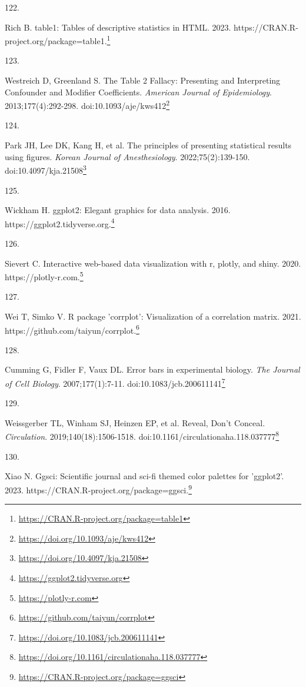 \documentclass[
]{book}
\newlength{\cslhangindent}
\newlength{\csllabelwidth}
\newlength{\cslentryspacingunit} %
\newenvironment{CSLReferences}[2] %
 {%
  \setlength{\parindent}{0pt}
  \ifodd #1
  \let\oldpar\par
  \def\par{\hangindent=\cslhangindent\oldpar}
  \fi
  \setlength{\parskip}{#2\cslentryspacingunit}
 }%
 {}
\newcommand{\CSLLeftMargin}[1]{\parbox[t]{\csllabelwidth}{#1}}
\newcommand{\CSLRightInline}[1]{\parbox[t]{\linewidth - \csllabelwidth}{#1}\break}
\renewcommand{\href}[2]{#2\footnote{\url{#1}}}
\begin{document}
\begin{CSLReferences}{0}{0}
\leavevmode{}%
\CSLLeftMargin{122. }%
\CSLRightInline{Rich B. table1: Tables of descriptive statistics in HTML. 2023. \href{https://CRAN.R-project.org/package=table1}{https://CRAN.R-project.org/package=table1.}}

\leavevmode{}%
\CSLLeftMargin{123. }%
\CSLRightInline{Westreich D, Greenland S. The Table 2 Fallacy: Presenting and Interpreting Confounder and Modifier Coefficients. \emph{American Journal of Epidemiology}. 2013;177(4):292-298. doi:\href{https://doi.org/10.1093/aje/kws412}{10.1093/aje/kws412}}

\leavevmode{}%
\CSLLeftMargin{124. }%
\CSLRightInline{Park JH, Lee DK, Kang H, et al. The principles of presenting statistical results using figures. \emph{Korean Journal of Anesthesiology}. 2022;75(2):139-150. doi:\href{https://doi.org/10.4097/kja.21508}{10.4097/kja.21508}}

\leavevmode{}%
\CSLLeftMargin{125. }%
\CSLRightInline{Wickham H. ggplot2: Elegant graphics for data analysis. 2016. \href{https://ggplot2.tidyverse.org}{https://ggplot2.tidyverse.org.}}

\leavevmode{}%
\CSLLeftMargin{126. }%
\CSLRightInline{Sievert C. Interactive web-based data visualization with r, plotly, and shiny. 2020. \href{https://plotly-r.com}{https://plotly-r.com.}}

\leavevmode{}%
\CSLLeftMargin{127. }%
\CSLRightInline{Wei T, Simko V. R package 'corrplot': Visualization of a correlation matrix. 2021. \href{https://github.com/taiyun/corrplot}{https://github.com/taiyun/corrplot.}}

\leavevmode{}%
\CSLLeftMargin{128. }%
\CSLRightInline{Cumming G, Fidler F, Vaux DL. Error bars in experimental biology. \emph{The Journal of Cell Biology}. 2007;177(1):7-11. doi:\href{https://doi.org/10.1083/jcb.200611141}{10.1083/jcb.200611141}}

\leavevmode{}%
\CSLLeftMargin{129. }%
\CSLRightInline{Weissgerber TL, Winham SJ, Heinzen EP, et al. Reveal, Don{'}t Conceal. \emph{Circulation}. 2019;140(18):1506-1518. doi:\href{https://doi.org/10.1161/circulationaha.118.037777}{10.1161/circulationaha.118.037777}}

\leavevmode{}%
\CSLLeftMargin{130. }%
\CSLRightInline{Xiao N. Ggsci: Scientific journal and sci-fi themed color palettes for 'ggplot2'. 2023. \href{https://CRAN.R-project.org/package=ggsci}{https://CRAN.R-project.org/package=ggsci.}}


\end{CSLReferences}
\end{document}
